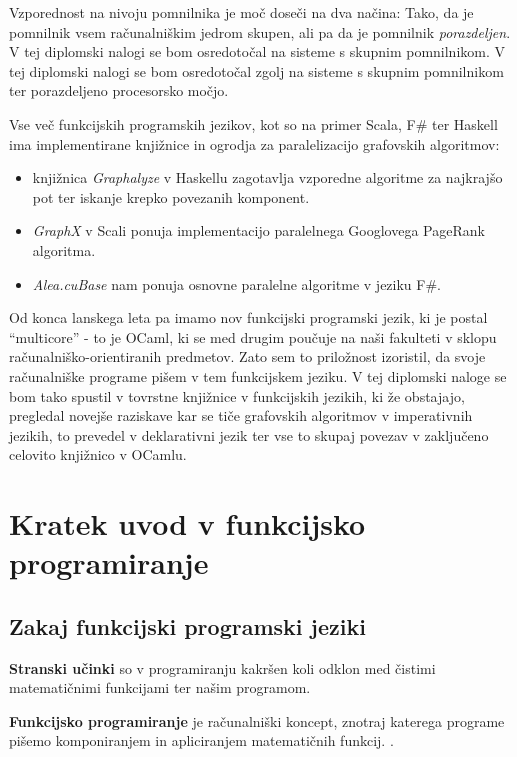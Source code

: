 \documentclass[mat1, tisk]{fmfdelo}
\begin{document}
Vzporednost na nivoju pomnilnika je moč doseči na dva načina: 
Tako, da je pomnilnik vsem računalniškim jedrom skupen, ali pa da je pomnilnik \textit{porazdeljen}. 
V tej diplomski nalogi se bom osredotočal na sisteme s skupnim pomnilnikom. 
V tej diplomski nalogi se bom osredotočal zgolj na sisteme s skupnim pomnilnikom ter porazdeljeno procesorsko močjo.

Vse več funkcijskih programskih jezikov, kot so na primer Scala, F\# ter Haskell ima implementirane knjižnice in ogrodja za paralelizacijo grafovskih algoritmov:
\begin{itemize}
    \item knjižnica \textit{Graphalyze} v Haskellu zagotavlja vzporedne algoritme za najkrajšo pot ter iskanje krepko povezanih komponent.
    \item \textit{GraphX} v Scali ponuja implementacijo paralelnega Googlovega PageRank algoritma.
    \item \textit{Alea.cuBase} nam ponuja osnovne paralelne algoritme v jeziku F\#.
\end{itemize}

Od konca lanskega leta pa imamo nov funkcijski programski jezik, ki je postal ``multicore'' - to je OCaml, ki se med drugim poučuje na naši fakulteti v sklopu računalniško-orientiranih predmetov. 
Zato sem to priložnost izoristil, da svoje računalniške programe pišem v tem funkcijskem jeziku. 
V tej diplomski naloge se bom tako spustil v tovrstne knjižnice v funkcijskih jezikih, ki že obstajajo, 
pregledal novejše raziskave kar se tiče grafovskih algoritmov v imperativnih jezikih, to prevedel v deklarativni jezik ter vse to skupaj povezav v zaključeno celovito knjižnico v OCamlu.

\section{Kratek uvod v funkcijsko programiranje}

\subsection{Zakaj funkcijski programski jeziki}

\begin{definicija}
\textbf{Stranski učinki} so v programiranju kakršen koli odklon med čistimi matematičnimi funkcijami ter našim programom.
\end{definicija}

\begin{definicija}
  \textbf{Funkcijsko programiranje} je računalniški koncept, znotraj katerega programe pišemo komponiranjem in apliciranjem matematičnih funkcij. 
  .
\end{definicija}
\end{document}
